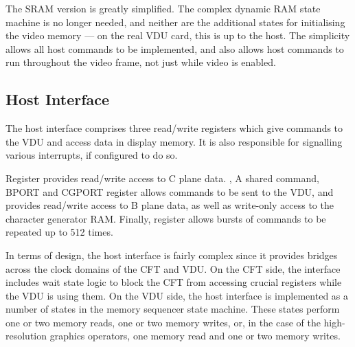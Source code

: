 The \gls{SRAM} version is greatly simplified. The complex dynamic RAM state
machine is no longer needed, and neither are the additional states for
initialising the video memory — on the real VDU card, this is up to the
host. The simplicity allows all host commands to be implemented, and also
allows host commands to run throughout the video frame, not just while video is
enabled.



\subsection{Host Interface}
\label{sec:vdu:host-interface}

The host interface comprises three read/write registers which give commands to
the VDU and access data in display memory. It is also responsible for
signalling various interrupts, if configured to do so.

Register  provides read/write access to C plane data. , A
shared command, BPORT and CGPORT register allows commands to be sent to the
VDU, and provides read/write access to B plane data, as well as write-only
access to the character generator RAM. Finally, register  allows
bursts of commands to be repeated up to 512 times.

In terms of design, the host interface is fairly complex since it provides
bridges across the clock domains of the CFT and VDU. On the CFT side, the
interface includes wait state logic to block the CFT from accessing crucial
registers while the VDU is using them. On the VDU side, the host interface is
implemented as a number of states in the memory sequencer state machine. These
states perform one or two memory reads, one or two memory writes, or, in the
case of the high-resolution graphics operators, one memory read and one or two
memory writes.








